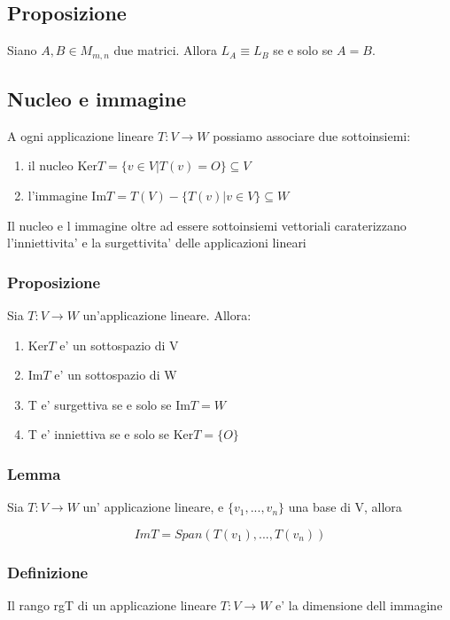 \documentclass{article}
\begin{document}
\subsection{Proposizione}
Siano $A,B \in M_{m,n}$ due matrici. Allora $L_A \equiv L_B$ se e solo se $A=B$.
\subsection{Nucleo e immagine}
\begin{flushleft}
	A ogni applicazione lineare $T:V \to W$ possiamo associare due sottoinsiemi:
\end{flushleft}
\begin{enumerate}
	\item il nucleo Ker$T=\{ v \in V | T(v)=O\} \subseteq V$
	\item l'immagine Im$T=T(V)-\{T(v)|v\in V\} \subseteq W$
\end{enumerate}
Il nucleo e l immagine oltre ad essere sottoinsiemi vettoriali caraterizzano l'inniettivita'
e la surgettivita' delle applicazioni lineari
\subsubsection{Proposizione}
Sia $T:V \to W$ un'applicazione lineare. Allora:
\begin{enumerate}
	\item Ker$T$ e' un sottospazio di V
	\item Im$T$ e' un sottospazio di W
	\item T e' surgettiva se e solo se Im$T=W$
	\item T e' inniettiva se e solo se Ker$T= \{ O \}$
\end{enumerate}
\subsubsection{Lemma}
\begin{flushleft}
	Sia $T: V\to W$ un' applicazione lineare, e $\{ v_1,...,v_n \}$ una base di V, allora
\end{flushleft}
\begin{equation*}
	ImT=Span(T(v_1),...,T(v_n))
\end{equation*}
\subsubsection{Definizione}
\begin{flushleft}
	Il rango rgT di un applicazione lineare $T:V \to W$ e' la dimensione dell immagine
\end{flushleft}
\end{document}
